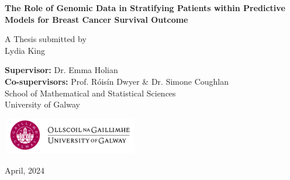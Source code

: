 \begin{titlepage}
\begin{center}
         \vspace{1cm}
         
        \Large
        \textbf{The Role of Genomic Data in Stratifying Patients within Predictive Models for Breast Cancer Survival Outcome}\\
        \vspace{0.5cm}
        \large
     
        \vspace{4cm}
        A Thesis submitted by \\ 
        Lydia King %
        
        
        \vspace{10.7cm}
            

        \large 
        \textbf{Supervisor:} Dr. Emma Holian \\
        \textbf{Co-supervisors:} Prof. Róisín Dwyer \& Dr. Simone Coughlan \\
        \vspace{0.5cm}
        \large
        School of Mathematical and Statistical Sciences \\
        University of Galway \\
        
        \vspace{0.5cm}
        
        \includegraphics[height = 1.6cm, width = 6cm]{../figures/Introduction/logo.png} \\
        
        \vspace{0.3cm}
        
        April, 2024
            
    \end{center}

\end{titlepage}
